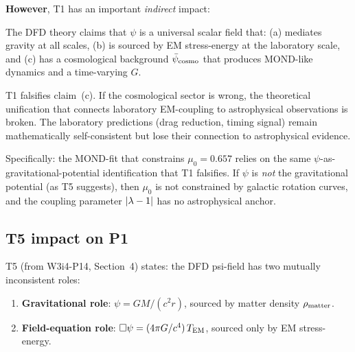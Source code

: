 \textbf{However}, T1 has an important \emph{indirect} impact:

\begin{finding}
\label{find:T1_indirect}
The DFD theory claims that $\psi$ is a universal scalar field that:
(a) mediates gravity at all scales,
(b) is sourced by EM stress-energy at the laboratory scale, and
(c) has a cosmological background $\bar{\psi}_{\rm cosmo}$ that produces MOND-like
dynamics and a time-varying $G$.

T1 falsifies claim~(c). If the cosmological sector is wrong, the
theoretical unification that connects laboratory EM-coupling to
astrophysical observations is broken. The laboratory predictions
(drag reduction, timing signal) remain mathematically self-consistent
but lose their connection to astrophysical evidence.

Specifically: the MOND-fit that constrains $\mu_0 = 0.657$ relies on the
same $\psi$-as-gravitational-potential identification that T1 falsifies.
If $\psi$ is \emph{not} the gravitational potential (as T5 suggests), then
$\mu_0$ is not constrained by galactic rotation curves, and the coupling
parameter $|\lambda - 1|$ has no astrophysical anchor.
\end{finding}

\subsection{T5 impact on P1}
\label{ssec:T5_impact}

T5 (from W3i4-P14, Section~4) states: the DFD psi-field has two
mutually inconsistent roles:
\begin{enumerate}[nosep]
\item \textbf{Gravitational role}: $\psi = GM/(c^2 r)$, sourced by matter
  density $\rho_{\rm matter}$.
\item \textbf{Field-equation role}: $\Box\psi = (4\pi G/c^4)\,T_{\rm EM}$,
  sourced only by EM stress-energy.
\end{enumerate}

